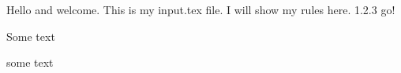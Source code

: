 Hello and welcome. This is my input.tex file. I will show my rules here. 1.2.3 go!
\begin{chapter}
\item Some text
\end{chapter}

\item some text

